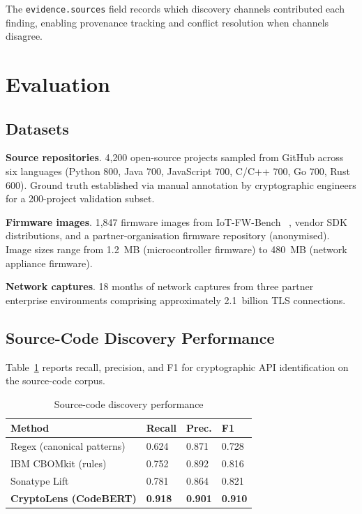 \documentclass[sigconf,nonacm]{acmart}
\begin{document}
The \texttt{evidence.sources} field records which discovery channels
contributed each finding, enabling provenance tracking and conflict
resolution when channels disagree.

\section{Evaluation}

\subsection{Datasets}

\textbf{Source repositories}. 4{,}200 open-source projects sampled
from GitHub across six languages (Python 800, Java 700, JavaScript
700, C/C++ 700, Go 700, Rust 600). Ground truth established via
manual annotation by cryptographic engineers for a 200-project
validation subset.

\textbf{Firmware images}. 1{,}847 firmware images from IoT-FW-Bench
~\cite{iotfwbench2024}, vendor SDK distributions, and a
partner-organisation firmware repository (anonymised). Image sizes
range from 1.2~MB (microcontroller firmware) to 480~MB (network
appliance firmware).

\textbf{Network captures}. 18 months of network captures from three
partner enterprise environments comprising approximately
2.1~billion TLS connections.

\subsection{Source-Code Discovery Performance}

Table~\ref{tab:source} reports recall, precision, and F1 for
cryptographic API identification on the source-code corpus.

\begin{table}[h]
\caption{Source-code discovery performance}
\label{tab:source}
\small
\begin{tabularx}{\columnwidth}{@{}p{2.6cm}X X X@{}}
\toprule
\textbf{Method} & \textbf{Recall} & \textbf{Prec.} & \textbf{F1} \\
\midrule
Regex (canonical patterns)   & 0.624 & 0.871 & 0.728 \\
IBM CBOMkit (rules)          & 0.752 & 0.892 & 0.816 \\
Sonatype Lift                & 0.781 & 0.864 & 0.821 \\
\textbf{CryptoLens (CodeBERT)} & \textbf{0.918} & \textbf{0.901} & \textbf{0.910} \\
\bottomrule
\end{tabularx}
\end{table}
\end{document}
